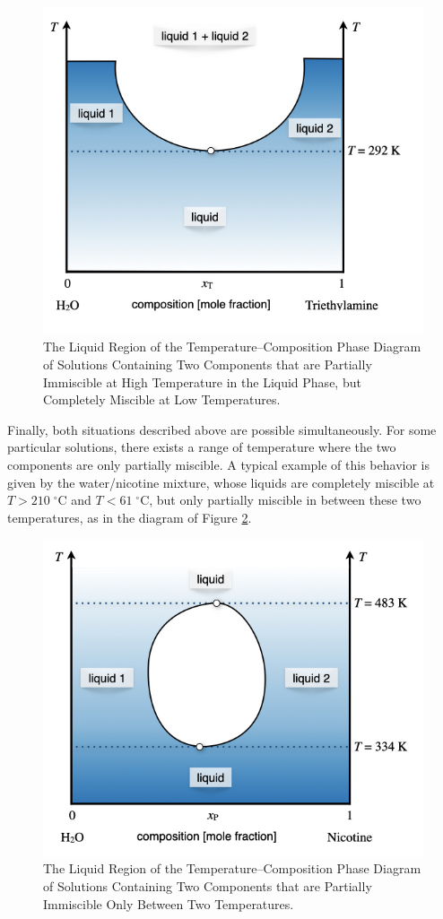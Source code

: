 \documentclass[
  9pt,
]{extbook}
\theoremstyle{definition}
\theoremstyle{definition}
\theoremstyle{definition}
\theoremstyle{remark}
\begin{document}
\begin{figure}

{\centering \includegraphics[width=0.6\linewidth]{./img/OEP_Figures.029} 

}

\caption{The Liquid Region of the Temperature–Composition Phase Diagram of Solutions Containing Two Components that are Partially Immiscible at High Temperature in the Liquid Phase, but Completely Miscible at Low Temperatures.}\label{fig:FigMC11}
\end{figure}

Finally, both situations described above are possible simultaneously. For some particular solutions, there exists a range of temperature where the two components are only partially miscible. A typical example of this behavior is given by the water/nicotine mixture, whose liquids are completely miscible at \(T>210\;^\circ \text{C}\) and \(T<61\;^\circ \text{C}\), but only partially miscible in between these two temperatures, as in the diagram of Figure \ref{fig:FigMC12}.

\begin{figure}

{\centering \includegraphics[width=0.6\linewidth]{./img/OEP_Figures.030} 

}

\caption{The Liquid Region of the Temperature–Composition Phase Diagram of Solutions Containing Two Components that are Partially Immiscible Only Between Two Temperatures.}\label{fig:FigMC12}
\end{figure}
\end{document}
